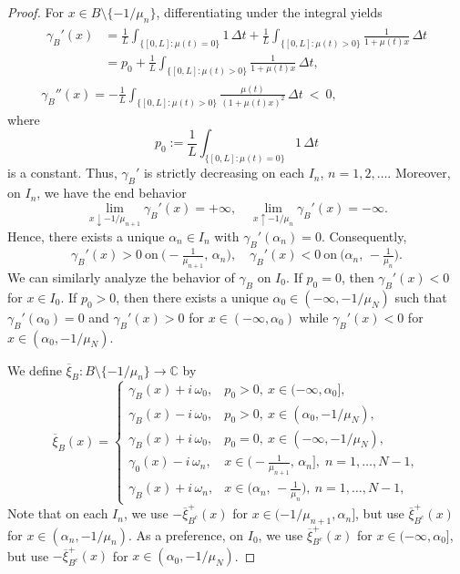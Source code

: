 \documentclass[10pt,a4paper]{amsart}
\numberwithin{equation}{section}
\begin{document}
\begin{proof}
For $x\in B\setminus\{-1/\mu_n\}$, differentiating under the integral yields
\begin{gather*}
\begin{aligned}
 \gamma_B'(x)
 &=\frac{1}{L}\int_{\{[0,L]:\mu(t)=0\}} 1\,\Delta t
 + \frac{1}{L}\int_{\{[0,L]:\mu(t)>0\}} \frac{1}{1+\mu(t) x}\,\Delta t\\
 &=p_0+\frac{1}{L}\int_{\{[0,L]:\mu(t)>0\}} \frac{1}{1+\mu(t) x}\,\Delta t,
\end{aligned}\\
\gamma_B''(x)
 =-\frac{1}{L}\int_{\{[0,L]:\mu(t)>0\}} \frac{\mu(t)}{(1+\mu(t) x)^2}\,\Delta t\ <\ 0,
\end{gather*}
where $$p_0:=\frac{1}{L}\int_{\{[0,L]:\mu(t)=0\}} 1\,\Delta t$$ is a constant.
Thus, $\gamma_B'$ is strictly decreasing on each $I_n$, $n=1,2,\dots$.
Moreover, on $I_n$, we have the end behavior
 \[
 \lim_{x\downarrow -1/\mu_{n+1}}\gamma_B'(x)=+\infty,\quad
 \lim_{x\uparrow -1/\mu_{n}}\gamma_B'(x)=-\infty.
 \]
Hence, there exists a unique $\alpha_n\in I_n$ with $\gamma_B'(\alpha_n)=0$.
Consequently,
 \[
 \gamma_B'(x)>0\ \text{on}\ \big(-\tfrac{1}{\mu_{n+1}},\,\alpha_n\big),
 \quad
 \gamma_B'(x)<0\ \text{on}\ \big(\alpha_n,\,-\tfrac{1}{\mu_n}\big).
 \]
We can similarly analyze the behavior of $\gamma_B$ on $I_0$. If $p_0=0$,
then $\gamma_B'(x)<0$ for $x\in I_0$. If $p_0>0$, then there exists a unique
$\alpha_0\in (-\infty,-1/\mu_N)$ such that $\gamma_B'(\alpha_0)=0$ and $\gamma_B'(x)>0$
for $x\in(-\infty,\alpha_0)$ while $\gamma_B'(x)<0$ for $x\in (\alpha_0,-1/\mu_N)$.

We define $\overline{\xi}_B:B\setminus\{-1/\mu_n\}\to\mathbb{C}$ by
 \begin{equation}\label{eff}
 \overline{\xi}_B(x)=
 \begin{cases}
 \gamma_B(x)+ i\,\omega_0, & p_0>0,\ x\in(-\infty,\alpha_0],\\[2pt]
 \gamma_B(x)- i\,\omega_0, & p_0>0,\ x\in(\alpha_0,-1/\mu_N),\\[2pt]
 \gamma_B(x)+ i\,\omega_0, & p_0=0,\ x\in(-\infty,-1/\mu_N),\\[2pt]
 \gamma_0(x)- i\,\omega_n, & x\in\big(-\tfrac{1}{\mu_{n+1}},\,\alpha_n\big],\;
  n=1,\dots,N-1,\\[2pt]
 \gamma_B(x)+ i\,\omega_n, & x\in\big(\alpha_n,\,-\tfrac{1}{\mu_n}\big),\ n=1,\dots,N-1,
 \end{cases}
 \end{equation}
Note that on each $I_n$, we use $-\overline{\xi}_{B^c}^+(x)$ for $x\in(-1/\mu_{n+1},\alpha_n]$,
but use $\overline{\xi}_{B^c}^+(x)$ for $x\in(\alpha_n,-1/\mu_n)$. As a preference, on $I_0$,
we use $\overline{\xi}_{B^c}^+(x)$ for $x\in(-\infty,\alpha_0]$, but use $-\overline{\xi}_{B^c}^+(x)$
for $x\in(\alpha_0,-1/\mu_N)$.


\end{proof}
\end{document}
